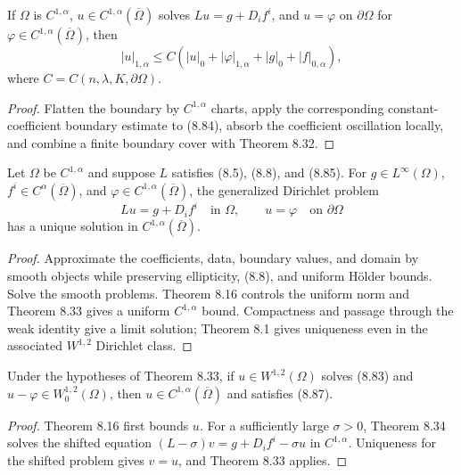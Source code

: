 \begin{theorem}
\label{gt-thm-8-33-global-gradient-holder}
If $\Omega$ is $C^{1,\alpha}$, $u\in C^{1,\alpha}(\overline\Omega)$ solves
$Lu=g+D_if^i$, and $u=\varphi$ on $\partial\Omega$ for
$\varphi\in C^{1,\alpha}(\overline\Omega)$, then
\begin{equation}
|u|_{1,\alpha}
\leq C(|u|_0+|\varphi|_{1,\alpha}+|g|_0+|f|_{0,\alpha}),
\tag{8.87}
\end{equation}
where $C=C(n,\lambda,K,\partial\Omega)$.
\end{theorem}
\begin{proof}
\sketch Flatten the boundary by $C^{1,\alpha}$ charts, apply the corresponding
constant-coefficient boundary estimate to (8.84), absorb the coefficient
oscillation locally, and combine a finite boundary cover with Theorem 8.32.
\end{proof}

\begin{theorem}
\label{gt-thm-8-34-c1alpha-dirichlet}
Let $\Omega$ be $C^{1,\alpha}$ and suppose $L$ satisfies (8.5), (8.8), and
(8.85). For $g\in L^\infty(\Omega)$,
$f^i\in C^\alpha(\overline\Omega)$, and
$\varphi\in C^{1,\alpha}(\overline\Omega)$, the generalized Dirichlet problem
\[
Lu=g+D_if^i\quad\text{in }\Omega,
\qquad u=\varphi\quad\text{on }\partial\Omega
\]
has a unique solution in $C^{1,\alpha}(\overline\Omega)$.
\end{theorem}
\begin{proof}
\sketch Approximate the coefficients, data, boundary values, and domain by smooth
objects while preserving ellipticity, (8.8), and uniform H\"older bounds. Solve the
smooth problems. Theorem 8.16 controls the uniform norm and Theorem 8.33 gives
a uniform $C^{1,\alpha}$ bound. Compactness and passage through the weak identity
give a limit solution; Theorem 8.1 gives uniqueness even in the associated
$W^{1,2}$ Dirichlet class.
\end{proof}

\begin{corollary}
\label{gt-cor-8-35-w12-global-gradient-estimate}
Under the hypotheses of Theorem 8.33, if $u\in W^{1,2}(\Omega)$ solves (8.83)
and $u-\varphi\in W_0^{1,2}(\Omega)$, then $u\in C^{1,\alpha}(\overline\Omega)$
and satisfies (8.87).
\end{corollary}
\begin{proof}
\sketch Theorem 8.16 first bounds $u$. For a sufficiently large $\sigma>0$,
Theorem 8.34 solves the shifted equation
$(L-\sigma)v=g+D_if^i-\sigma u$ in $C^{1,\alpha}$. Uniqueness for the shifted
problem gives $v=u$, and Theorem 8.33 applies.
\end{proof}

